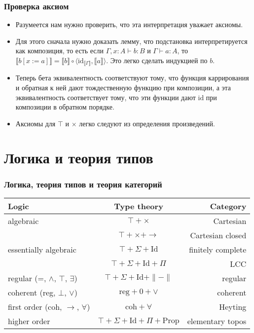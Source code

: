 \documentclass{beamer}
\theoremstyle{definition}
\renewcommand{\ll}{\llbracket}
\newcommand{\rr}{\rrbracket}
\newcommand{\fs}[1]{\mathrm{#1}}
\begin{document}
\begin{frame}
\frametitle{Проверка аксиом}
\begin{itemize}
\item Разумеется нам нужно проверить, что эта интерпретация уважает аксиомы.
\item Для этого сначала нужно доказать лемму, что подстановка интерпретируется как композиция, то есть если $\Gamma, x : A \vdash b : B$ и $\Gamma \vdash a : A$,
то $\ll b[x := a] \rr = \ll b \rr \circ \langle \fs{id}_{\ll \Gamma \rr}, \ll a \rr \rangle$.
Это легко сделать индукцией по $b$.
\item Теперь бета эквивалентность соответствуют тому, что функция каррирования и обратная к ней дают тождественную функцию при композиции,
а эта эквивалентность соответствует тому, что эти функции дают $\fs{id}$ при композиции в обратном порядке.
\item Аксиомы для $\top$ и $\times$ легко следуют из определения произведений.
\end{itemize}
\end{frame}

\section{Логика и теория типов}

\begin{frame}
\frametitle{Логика, теория типов и теория категорий}
\begin{center}
  \begin{tabular}{ l | c | r }
    Logic                                   & Type theory                                   & Category \\ \hline
    algebraic                               & $\top + \times$                               & Cartesian \\
                                            & $\top + \times + \to$                         & Cartesian closed \\
    essentially algebraic                   & $\top + \Sigma + \fs{Id}$                     & finitely complete \\
                                            & $\top + \Sigma + \fs{Id} + \Pi$               & LCC \\
    regular (=, $\land$, $\top$, $\exists$) & $\top + \Sigma + \fs{Id} + \| - \|$           & regular \\
    coherent (reg, $\bot$, $\lor$)          & $\text{reg} + 0 + \lor$                       & coherent \\
    first order (coh, $\to$, $\forall$)     & $\text{coh} + \forall$                        & Heyting \\
    higher order                            & $\top + \Sigma + \fs{Id} + \Pi + \fs{Prop}$   & elementary topos \\
  \end{tabular}
\end{center}
\end{frame}
\end{document}
